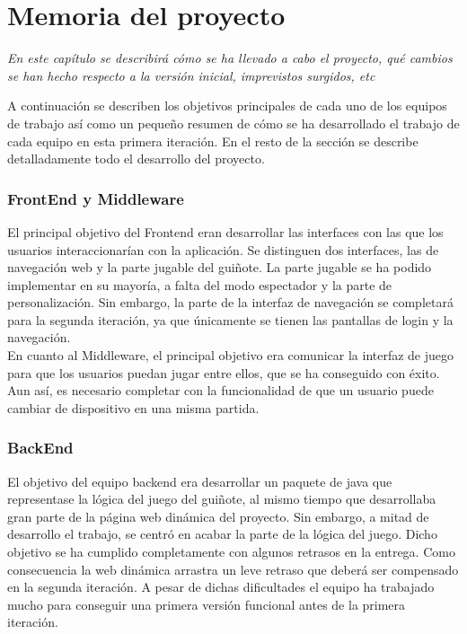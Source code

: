 \section{Memoria del proyecto}
\label{memoria}
\emph{En este capítulo se describirá cómo se ha llevado a cabo el proyecto, qué cambios se han hecho respecto a la versión inicial, imprevistos surgidos, etc}

A continuación se describen los objetivos principales de cada uno de los equipos de trabajo así como un pequeño resumen de cómo se ha desarrollado el trabajo de cada equipo en esta primera iteración. En el resto de la sección se describe detalladamente todo el desarrollo del proyecto.\\

\subsubsection*{FrontEnd y Middleware}
El principal objetivo del Frontend eran desarrollar las interfaces con las que los usuarios interaccionarían con la aplicación. Se distinguen dos interfaces, las de navegación web y la parte jugable del guiñote. La parte jugable se ha podido implementar en su mayoría, a falta del modo espectador y la parte de personalización. Sin embargo, la parte de la interfaz de navegación se completará para la segunda iteración, ya que únicamente se tienen las pantallas de login y la navegación.
\\
En cuanto al Middleware, el principal objetivo era comunicar la interfaz de juego para que los usuarios puedan jugar entre ellos, que se ha conseguido con éxito. Aun así, es necesario completar con la funcionalidad de que un usuario puede cambiar de dispositivo en una misma partida.

\subsubsection*{BackEnd}
El objetivo del equipo backend era desarrollar un paquete de java que representase la lógica del juego del guiñote, al mismo tiempo que desarrollaba gran parte de la página web dinámica del proyecto. Sin embargo, a mitad de desarrollo el trabajo, se centró en acabar la parte de la lógica del juego. Dicho objetivo se ha cumplido completamente con algunos retrasos en la entrega. Como consecuencia la web dinámica arrastra un leve retraso que deberá ser compensado en la segunda iteración. A pesar de dichas dificultades el equipo ha trabajado mucho para conseguir una primera versión funcional antes de la primera iteración.

